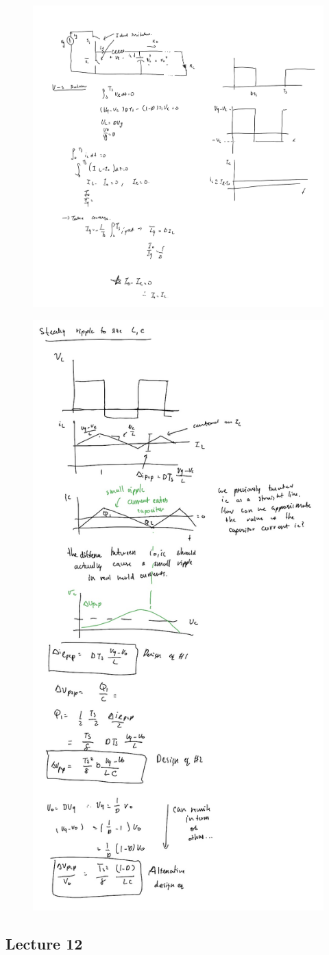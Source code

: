 \documentclass[../notes.tex]{subfiles}
\begin{document}
\begin{figure}[H]
	\centering
	\includegraphics[width=0.8\linewidth]{img/image_2022-09-29-11-58-31.png}
\end{figure}

\begin{fullpage}

\begin{figure}[H]
	\centering
	\includegraphics[width=0.6\linewidth]{img/image_2022-09-29-11-58-49.png}
\end{figure}

\end{fullpage}


\subsection{Lecture 12}
\end{document}
